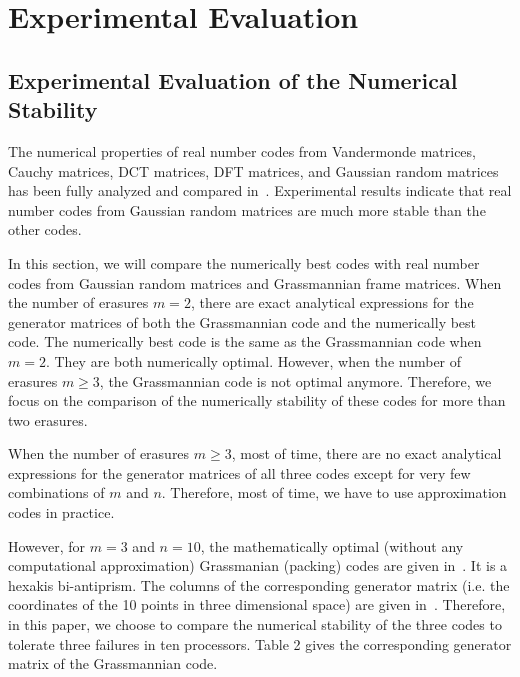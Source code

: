 \documentclass{sig-alternate}
\begin{document}
\section{Experimental Evaluation}


\subsection{Experimental Evaluation of the Numerical Stability}

The numerical properties of real number codes from Vandermonde matrices, Cauchy matrices, 
DCT matrices, DFT matrices, and Gaussian random matrices has been fully 
analyzed and compared in~\cite{zchen:random_codes}. Experimental results indicate that real 
number codes from  Gaussian random matrices
are much more stable than the other codes.

In this section, we will compare the numerically best codes with real number codes from 
Gaussian random matrices and Grassmannian frame matrices. 
When the number of erasures $m=2$, there are exact analytical expressions for the generator matrices 
of both the Grassmannian code and the numerically best code. The numerically best code
is the same as the Grassmannian code when $m=2$. They are both numerically optimal.
However, when the number of erasures $m\geq3$, the Grassmannian code is not optimal anymore.
Therefore, we focus on the comparison of the numerically stability of these codes for more than two erasures.



When the number of erasures $m\geq3$, most of time, there are no exact 
analytical expressions for the generator matrices of all three codes except for very 
few combinations of $m$ and $n$. Therefore, most of time, we have to use 
approximation codes in practice.

However, for $m=3$ and $n=10$, the mathematically optimal (without any computational approximation) 
Grassmanian (packing) codes are given in~\cite{conway:grassmannian}. It is a hexakis bi-antiprism. The columns of the 
corresponding generator matrix (i.e. the coordinates of the 10 points in three dimensional space)
are given in~\cite{grass}. Therefore, in this paper, we choose to compare the numerical stability of the three codes
to tolerate three failures in ten processors. Table 2 gives the corresponding generator matrix
of the Grassmannian code.
\end{document}
